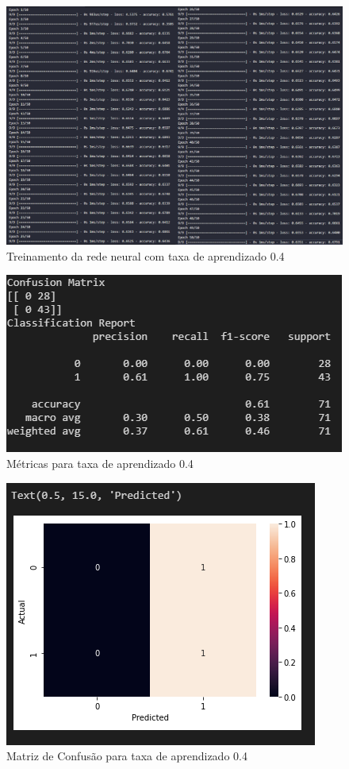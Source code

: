 \documentclass[12pt]{article}
\begin{document}
\begin{figure}[H]
	\centering
	\includegraphics[width=1.1\linewidth]{Imagens/taxa04/fittaxa04}
	\caption{Treinamento da rede neural com taxa de aprendizado 0.4}
	\label{fig:fittaxa04}
\end{figure}
\begin{figure}[H]
	\centering
	\includegraphics[width=0.7\linewidth]{Imagens/taxa04/metricastaxa04}
	\caption{Métricas para taxa de aprendizado 0.4}
	\label{fig:metricastaxa04}
\end{figure}
\begin{figure}[H]
	\centering
	\includegraphics[width=0.7\linewidth]{Imagens/taxa04/confusaotaxa04}
	\caption{Matriz de Confusão para taxa de aprendizado 0.4}
	\label{fig:confusaotaxa04}
\end{figure}
\end{document}
